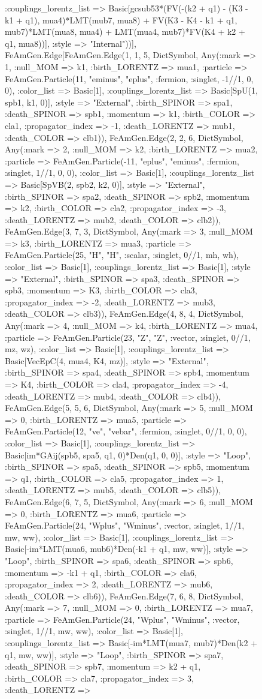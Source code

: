 \documentclass{revtex4}
\begin{document}
\begin{figure}[!htb]
\begin{center}
{:couplings_lorentz_list => Basic[gcsub53*(FV(-(k2 + q1) - (K3 - k1 + q1), mua4)*LMT(mub7, mua8) + FV(K3 - K4 - k1 + q1, mub7)*LMT(mua8, mua4) + LMT(mua4, mub7)*FV(K4 + k2 + q1, mua8))], :style => "Internal"))], FeAmGen.Edge[FeAmGen.Edge(1, 1, 5, Dict{Symbol, Any}(:mark => 1, :null_MOM => k1, :birth_LORENTZ => mua1, :particle => FeAmGen.Particle(11, "eminus", "eplus", :fermion, :singlet, -1//1, 0, 0), :color_list => Basic[1], :couplings_lorentz_list => Basic[SpU(1, spb1, k1, 0)], :style => "External", :birth_SPINOR => spa1, :death_SPINOR => spb1, :momentum => k1, :birth_COLOR => cla1, :propagator_index => -1, :death_LORENTZ => mub1, :death_COLOR => clb1)), FeAmGen.Edge(2, 2, 6, Dict{Symbol, Any}(:mark => 2, :null_MOM => k2, :birth_LORENTZ => mua2, :particle => FeAmGen.Particle(-11, "eplus", "eminus", :fermion, :singlet, 1//1, 0, 0), :color_list => Basic[1], :couplings_lorentz_list => Basic[SpVB(2, spb2, k2, 0)], :style => "External", :birth_SPINOR => spa2, :death_SPINOR => spb2, :momentum => k2, :birth_COLOR => cla2, :propagator_index => -3, :death_LORENTZ => mub2, :death_COLOR => clb2)), FeAmGen.Edge(3, 7, 3, Dict{Symbol, Any}(:mark => 3, :null_MOM => k3, :birth_LORENTZ => mua3, :particle => FeAmGen.Particle(25, "H", "H", :scalar, :singlet, 0//1, mh, wh), :color_list => Basic[1], :couplings_lorentz_list => Basic[1], :style => "External", :birth_SPINOR => spa3, :death_SPINOR => spb3, :momentum => K3, :birth_COLOR => cla3, :propagator_index => -2, :death_LORENTZ => mub3, :death_COLOR => clb3)), FeAmGen.Edge(4, 8, 4, Dict{Symbol, Any}(:mark => 4, :null_MOM => k4, :birth_LORENTZ => mua4, :particle => FeAmGen.Particle(23, "Z", "Z", :vector, :singlet, 0//1, mz, wz), :color_list => Basic[1], :couplings_lorentz_list => Basic[VecEpC(4, mua4, K4, mz)], :style => "External", :birth_SPINOR => spa4, :death_SPINOR => spb4, :momentum => K4, :birth_COLOR => cla4, :propagator_index => -4, :death_LORENTZ => mub4, :death_COLOR => clb4)), FeAmGen.Edge(5, 5, 6, Dict{Symbol, Any}(:mark => 5, :null_MOM => 0, :birth_LORENTZ => mua5, :particle => FeAmGen.Particle(12, "ve", "vebar", :fermion, :singlet, 0//1, 0, 0), :color_list => Basic[1], :couplings_lorentz_list => Basic[im*GAij(spb5, spa5, q1, 0)*Den(q1, 0, 0)], :style => "Loop", :birth_SPINOR => spa5, :death_SPINOR => spb5, :momentum => q1, :birth_COLOR => cla5, :propagator_index => 1, :death_LORENTZ => mub5, :death_COLOR => clb5)), FeAmGen.Edge(6, 7, 5, Dict{Symbol, Any}(:mark => 6, :null_MOM => 0, :birth_LORENTZ => mua6, :particle => FeAmGen.Particle(24, "Wplus", "Wminus", :vector, :singlet, 1//1, mw, ww), :color_list => Basic[1], :couplings_lorentz_list => Basic[-im*LMT(mua6, mub6)*Den(-k1 + q1, mw, ww)], :style => "Loop", :birth_SPINOR => spa6, :death_SPINOR => spb6, :momentum => -k1 + q1, :birth_COLOR => cla6, :propagator_index => 2, :death_LORENTZ => mub6, :death_COLOR => clb6)), FeAmGen.Edge(7, 6, 8, Dict{Symbol, Any}(:mark => 7, :null_MOM => 0, :birth_LORENTZ => mua7, :particle => FeAmGen.Particle(24, "Wplus", "Wminus", :vector, :singlet, 1//1, mw, ww), :color_list => Basic[1], :couplings_lorentz_list => Basic[-im*LMT(mua7, mub7)*Den(k2 + q1, mw, ww)], :style => "Loop", :birth_SPINOR => spa7, :death_SPINOR => spb7, :momentum => k2 + q1, :birth_COLOR => cla7, :propagator_index => 3, :death_LORENTZ => }
\end{center}
\end{figure}
\end{document}
